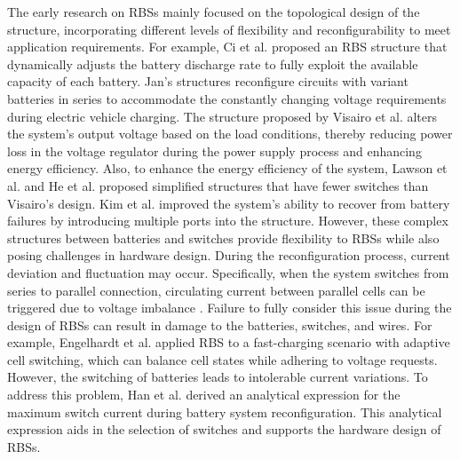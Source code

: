 \documentclass{article}
\begin{document}
The early research on RBSs mainly focused on the topological design of the structure, incorporating different levels of flexibility and reconfigurability to meet application requirements.
For example, Ci et al. \cite{ci2007novel} proposed an RBS structure that dynamically adjusts the battery discharge rate to fully exploit the available capacity of each battery. 
Jan's \cite{9209774,engelhardt2021double} structures reconfigure circuits with variant batteries in series to accommodate the constantly changing voltage requirements during electric vehicle charging.
The structure proposed by Visairo et al. \cite{visairoReconfigurableBatteryPack2008} alters the system's output voltage based on the load conditions, thereby reducing power loss in the voltage regulator during the power supply process and enhancing energy efficiency. 
Also, to enhance the energy efficiency of the system, Lawson et al. \cite{lawsonSoftwareConfigurableBattery2012} and He et al. \cite{he2014reconfiguration}  proposed simplified structures that have fewer switches than Visairo's design.
Kim et al. \cite{kim2009dynamic} improved the system's ability to recover from battery failures by introducing multiple ports into the structure. 
However, these complex structures between batteries and switches provide flexibility to RBSs while also posing challenges in hardware design. 
During the reconfiguration process, current deviation and fluctuation may occur. Specifically, when the system switches from series to parallel connection, circulating current between parallel cells can be triggered due to voltage imbalance \cite{hanAnalysisEstimationMaximum2020}. Failure to fully consider this issue during the design of RBSs can result in damage to the batteries, switches, and wires. 
For example, Engelhardt et al. \cite{engelhardtDoubleStringBatterySystem2021} applied RBS to a fast-charging scenario with adaptive cell switching, which can balance cell states while adhering to voltage requests. However, the switching of batteries leads to intolerable current variations. 
To address this problem, Han et al. \cite{han2021analysis} derived an analytical expression for the maximum switch current during battery system reconfiguration. This analytical expression aids in the selection of switches and supports the hardware design of RBSs.
\end{document}
